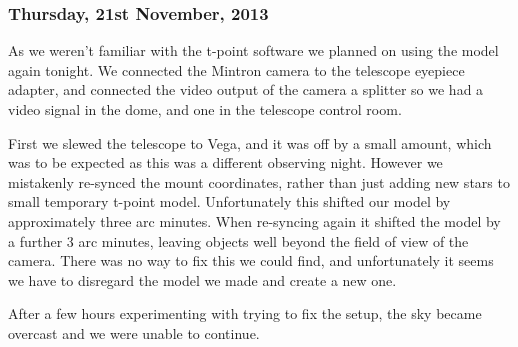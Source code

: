 \subsubsection*{Thursday, 21st November, 2013}

As we weren't familiar with the t-point software we planned on using the model again tonight. We connected the Mintron camera to the telescope eyepiece adapter, and connected the video output of the camera a splitter so we had a video signal in the dome, and one in the telescope control room.

First we slewed the telescope to Vega, and it was off by a small amount, which was to be expected as this was a different observing night. However we mistakenly re-synced the mount coordinates, rather than just adding new stars to small temporary t-point model. Unfortunately this shifted our model by approximately three arc minutes. When re-syncing again it shifted the model by a further 3 arc minutes, leaving objects well beyond the field of view of the camera. There was no way to fix this we could find, and unfortunately it seems we have to disregard the model we made and create a new one.

After a few hours experimenting with trying to fix the setup, the sky became overcast and we were unable to continue.